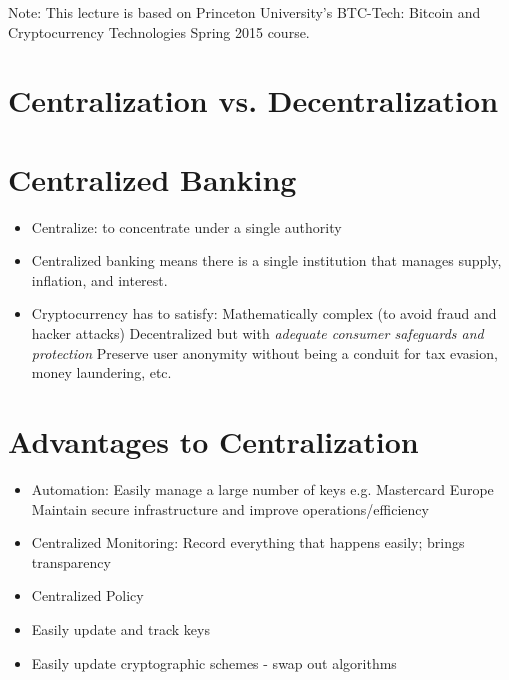 \documentclass{article}
\begin{document}
\maketitle

Note: This lecture is based on Princeton University's BTC-Tech: Bitcoin and Cryptocurrency Technologies Spring 2015 course.


\section*{Centralization vs. Decentralization}
\section*{Centralized Banking}
\begin{itemize}
  \item Centralize: to concentrate under a single authority
  \item Centralized banking means there is a single institution that manages supply, inflation, and interest.
  \item Cryptocurrency has to satisfy:
    \subitem Mathematically complex (to avoid fraud and hacker attacks)
    \subitem Decentralized but with \emph{adequate consumer safeguards and protection}
    \subitem Preserve user anonymity without being a conduit for tax evasion, money laundering, etc.
\end{itemize}
\section*{Advantages to Centralization}
\begin{itemize}
  \item Automation:
    \subitem Easily manage a large number of keys e.g. Mastercard Europe
    \subitem Maintain secure infrastructure and improve operations/efficiency
  \item Centralized Monitoring:
    \subitem Record everything that happens easily; brings transparency
  \item Centralized Policy
  \item Easily update and track keys
  \item Easily update cryptographic schemes - swap out algorithms
\end{itemize}
\end{document}
